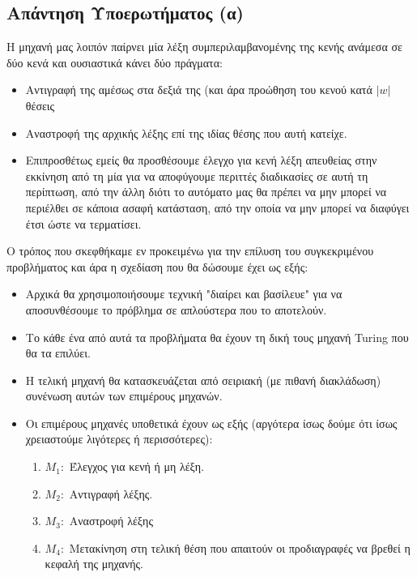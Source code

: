 \subsection{Απάντηση Υποερωτήματος (α)}
\label{ssec:Solution_1.1}
\doublespacing
Η μηχανή μας λοιπόν παίρνει μία λέξη συμπεριλαμβανομένης της κενής ανάμεσα σε δύο κενά και ουσιαστικά κάνει δύο
πράγματα:
\begin{itemize}
	\itemsep0em
	\item Αντιγραφή της αμέσως στα δεξιά της (και άρα προώθηση του κενού κατά $|w|$ θέσεις
	\item Αναστροφή της αρχικής λέξης επί της ιδίας θέσης που αυτή κατείχε.
	\item Επιπροσθέτως εμείς θα προσθέσουμε έλεγχο για κενή λέξη απευθείας στην εκκίνηση από τη μία για να
	αποφύγουμε περιττές διαδικασίες σε αυτή τη περίπτωση, από την άλλη διότι το αυτόματο μας θα πρέπει να μην
	μπορεί να περιέλθει σε κάποια ασαφή κατάσταση, από την οποία να μην μπορεί να διαφύγει έτσι ώστε να τερματίσει.
\end{itemize}

\par Ο τρόπος που σκεφθήκαμε εν προκειμένω για την επίλυση του συγκεκριμένου προβλήματος και άρα η σχεδίαση που θα
δώσουμε έχει ως εξής:
\begin{itemize}
	\itemsep0em
	\item Αρχικά θα χρησιμοποιήσουμε τεχνική "διαίρει και βασίλευε" για να αποσυνθέσουμε το πρόβλημα σε απλούστερα
	που το αποτελούν.
	\item Το κάθε ένα από αυτά τα προβλήματα θα έχουν τη δική τους μηχανή Turing που θα τα επιλύει.
	\item Η τελική μηχανή θα κατασκευάζεται από σειριακή (με πιθανή διακλάδωση) συνένωση αυτών των επιμέρους
	μηχανών.\clearpage
	\item Οι επιμέρους μηχανές υποθετικά έχουν ως εξής (αργότερα ίσως δούμε ότι ίσως χρειαστούμε λιγότερες ή
	περισσότερες):
		\begin{enumerate}
			\item $M_1:$ Έλεγχος για κενή ή μη λέξη.

			\item $Μ_2:$ Αντιγραφή λέξης.

			\item $Μ_3:$ Αναστροφή λέξης

			\item $M_4:$ Μετακίνηση στη τελική θέση που απαιτούν οι προδιαγραφές να βρεθεί η κεφαλή της μηχανής.
		\end{enumerate}
\end{itemize}

